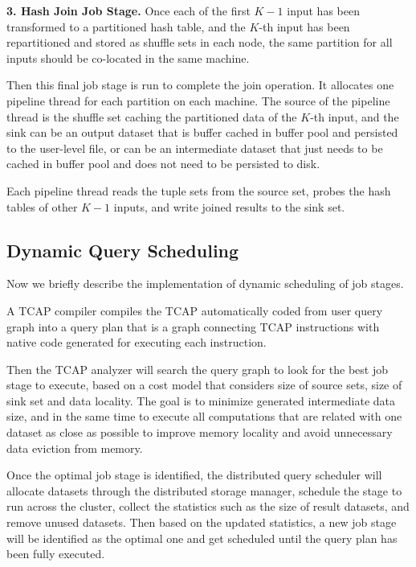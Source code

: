 \vspace{5pt}
{\bf 3. Hash Join Job Stage.} Once each of the first $K-1$ input has been transformed to a partitioned hash table, and the $K$-th input has been repartitioned and stored as shuffle sets in each node, the same partition for all inputs should be co-located in the same machine. 

Then this final job stage is run to complete the join operation. It allocates one pipeline thread for each partition on each machine. The source of the pipeline thread is the shuffle set caching the partitioned data of the $K$-th input, and the sink can be an output dataset that is buffer cached in buffer pool and persisted to the user-level file, or can be an intermediate dataset that just needs to be cached in buffer pool and does not need to be persisted to disk. 

Each pipeline thread reads the tuple sets from the source set, probes the hash tables of other $K-1$ inputs, and write joined results to the sink set.

\subsection{Dynamic Query Scheduling}
Now we briefly describe the implementation of dynamic scheduling of job stages. 

A TCAP compiler compiles the TCAP automatically coded from user query graph into a query plan that is a graph connecting TCAP instructions with native code generated for executing each instruction. 

Then the TCAP analyzer will search the query graph to look for the best job stage to execute, based on a cost model that considers size of source sets, size of sink set and data locality. The goal is to minimize generated intermediate data size,  and in the same time to execute all computations that are related with one dataset as close as possible to improve memory locality and avoid unnecessary data eviction from memory.

Once the optimal job stage is identified, the distributed query scheduler will allocate datasets through the distributed storage manager, schedule the stage to run across the cluster, collect the statistics such as the size of result datasets, and remove unused datasets. Then based on the updated statistics, a new job stage will be identified as the optimal one and get scheduled until the query plan has been fully executed.